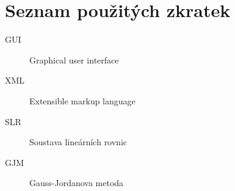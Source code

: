 \documentclass[thesis=M,czech]{FITthesis}[2012/06/26]
\begin{document}



\appendix

\chapter{Seznam použitých zkratek}
\begin{description}
	\item[GUI] Graphical user interface
	\item[XML] Extensible markup language
	
	\item[SLR] Soustava lineárních rovnic
	\item[GJM] Gauss-Jordanova metoda
\end{description}
\end{document}
